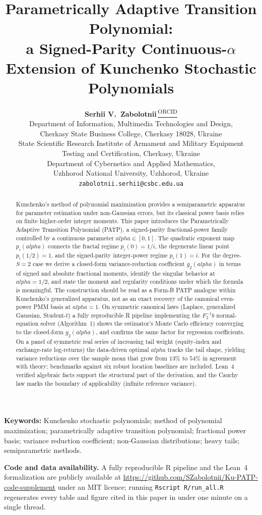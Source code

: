 \documentclass[11pt]{article}
\title{Parametrically Adaptive Transition Polynomial:\\
a Signed-Parity Continuous-$\alpha$ Extension of Kunchenko Stochastic Polynomials}
\author{\textbf{Serhii V.\ Zabolotnii}\,\href{https://orcid.org/0000-0003-0242-2234}{\textsuperscript{\textcolor{orcidgreen}{\scriptsize ORCID}}}\\[0.5em]
\small Department of Information, Multimedia Technologies and Design,\\
\small Cherkasy State Business College, Cherkasy 18028, Ukraine\\[0.2em]
\small State Scientific Research Institute of Armament and Military Equipment\\
\small Testing and Certification, Cherkasy, Ukraine\\[0.2em]
\small Department of Cybernetics and Applied Mathematics,\\
\small Uzhhorod National University, Uzhhorod, Ukraine\\[0.4em]
\small \texttt{zabolotnii.serhii@csbc.edu.ua}}
\date{}
\def\alpha{alpha}%
\def\mathbf#1{#1}%
\theoremstyle{definition}
\providecommand{\proglang}[1]{\textsf{#1}}
\begin{document}
\maketitle

\begin{abstract}
Kunchenko's method of polynomial maximization provides a semiparametric
apparatus for parameter estimation under non-Gaussian errors, but its
classical power basis relies on finite higher-order integer moments. This
paper introduces the Parametrically Adaptive Transition Polynomial (PATP),
a signed-parity fractional-power family controlled by a continuous
parameter $\alpha \in [0,1]$. The quadratic exponent map $p_i(\alpha)$
connects the fractal regime $p_i(0)=1/i$, the degenerate linear point
$p_i(1/2)=1$, and the signed-parity integer-power regime $p_i(1)=i$. For
the degree-$S=2$ case we derive a closed-form variance-reduction
coefficient $g_2(\alpha)$ in terms of signed and absolute fractional
moments, identify the singular behavior at $\alpha=1/2$, and state the
moment and regularity conditions under which the formula is meaningful.
The construction should be read as a Form-B PATP analogue within
Kunchenko's generalized apparatus, not as an exact recovery of the
canonical even-power PMM basis at $\alpha=1$. On symmetric canonical laws
(Laplace, generalized Gaussian, Student-$t$) a fully reproducible \proglang{R}
pipeline implementing the $\mathbf{F}_2^{-1}\mathbf{b}$ normal-equation solver
(Algorithm~1) shows the estimator's Monte Carlo efficiency converging to the
closed-form $g_2(\alpha)$, and confirms the same factor for regression
coefficients. On a panel of symmetric real series of increasing tail weight
(equity-index and exchange-rate log-returns) the data-driven optimal $\alpha$
tracks the tail shape, yielding variance reductions over the sample mean that
grow from $13\%$ to $54\%$ in agreement with theory; benchmarks against six
robust location baselines are included. Lean~4 verified algebraic facts support the
structural part of the derivation, and the Cauchy law marks the boundary of
applicability (infinite reference variance).
\end{abstract}

\noindent\textbf{Keywords:} Kunchenko stochastic polynomials; method of
polynomial maximization; parametrically adaptive transition polynomial;
fractional power basis; variance reduction coefficient; non-Gaussian
distributions; heavy tails; semiparametric methods.

\medskip
\noindent\textbf{Code and data availability.} A fully reproducible R
pipeline and the Lean~4 formalization are publicly available at
\url{https://github.com/SZabolotnii/Ku-PATP-code-supplement} under an
MIT licence; running \texttt{Rscript R/run\_all.R} regenerates every
table and figure cited in this paper in under one minute on a single
thread.
\end{document}
